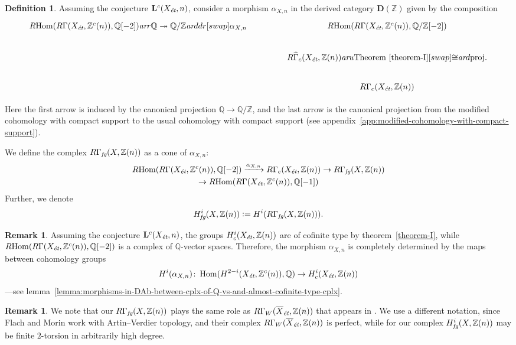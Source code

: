 \documentclass[leqno,12pt]{article}
\theoremstyle{plain}
\theoremstyle{definition}
\newtheorem{definition}[theorem]{\indent\sc Definition}
\newtheorem{remark}[theorem]{\indent\sc Remark}
\DeclareMathOperator{\Hom}{Hom}
\newcommand{\QQ}{\mathbb{Q}}
\newcommand{\ZZ}{\mathbb{Z}}
\newcommand{\dfn}{\mathrel{\mathop:}=}
\newcommand{\ar}{\text{\it ar}}
\newcommand{\et}{\text{\it \'{e}t}}
\newcommand{\fg}{\text{\it fg}}
\newcommand{\RHom}{R\!\Hom}
\begin{document}
\begin{definition}
  \label{def:RGamma-fg}
  Assuming the conjecture $\mathbf{L}^c (X_\et,n)$, consider a morphism
  $\alpha_{X,n}$ in the derived category $\mathbf{D} (\ZZ)$ given by the
  composition
  \[ \begin{tikzcd}[column sep=4em]
    \RHom (R\Gamma (X_\et, \ZZ^c (n)), \QQ[-2]) \ar{r}{\QQ \twoheadrightarrow \QQ/\ZZ}\ar{ddr}[swap]{\alpha_{X,n}} & \RHom (R\Gamma (X_\et, \ZZ^c (n)), \QQ/\ZZ[-2]) \\
    & R\widehat{\Gamma}_c (X_\et, \ZZ (n)) \ar{u}{\text{Theorem \ref{theorem-I}}}[swap]{\cong} \ar{d}{\text{proj.}} \\
    & R\Gamma_c (X_\et, \ZZ (n))
  \end{tikzcd} \]

  Here the first arrow is induced by the canonical projection $\QQ \to \QQ/\ZZ$,
  and the last arrow is the canonical projection from the modified cohomology
  with compact support to the usual cohomology with compact support
  (see appendix~\ref{app:modified-cohomology-with-compact-support}).

  We define the complex $R\Gamma_\fg (X, \ZZ(n))$ as a cone of $\alpha_{X,n}$:
  \begin{multline*}
    \RHom (R\Gamma (X_\et, \ZZ^c (n)), \QQ [-2]) \xrightarrow{\alpha_{X,n}}
    R\Gamma_c (X_\et, \ZZ (n)) \to
    R\Gamma_\fg (X, \ZZ(n)) \\
    \to \RHom (R\Gamma (X_\et, \ZZ^c (n)), \QQ [-1])
  \end{multline*}
  Further, we denote
  $$H^i_\fg (X, \ZZ (n)) \dfn H^i (R\Gamma_\fg (X, \ZZ (n))).$$
\end{definition}

\begin{remark}
  \label{rmk:alpha-X-n-determined-by-cohomology}
  Assuming the conjecture $\mathbf{L}^c (X_\et, n)$, the groups
  $H^i_c (X_\et, \ZZ (n))$ are of cofinite type by theorem~\ref{theorem-I},
  while $\RHom (R\Gamma (X_\et, \ZZ^c (n)), \QQ [-2])$ is a complex of
  $\QQ$-vector spaces. Therefore, the morphism $\alpha_{X,n}$ is completely
  determined by the maps between cohomology groups
  \[ H^i (\alpha_{X,n})\colon
    \Hom (H^{2-i} (X_\et, \ZZ^c (n)), \QQ) \to
    H^i_c (X_\et, \ZZ (n)) \]
  ---see lemma~\ref{lemma:morphisms-in-DAb-between-cplx-of-Q-vs-and-almost-cofinite-type-cplx}.
\end{remark}

\begin{remark}
  We note that our $R\Gamma_\fg (X, \ZZ (n))$ plays the same role as
  $R\Gamma_W (\overline{X}_\et, \ZZ (n))$ that appears in
  \cite[Definition~3.6]{Flach-Morin-2018}. We use a different notation, since
  Flach and Morin work with Artin--Verdier topology, and their complex
  $R\Gamma_W (\overline{X}_\et, \ZZ (n))$ is perfect, while for our complex
  $H^i_\fg (X, \ZZ (n))$ may be finite $2$-torsion in arbitrarily high degree.
\end{remark}
\end{document}
